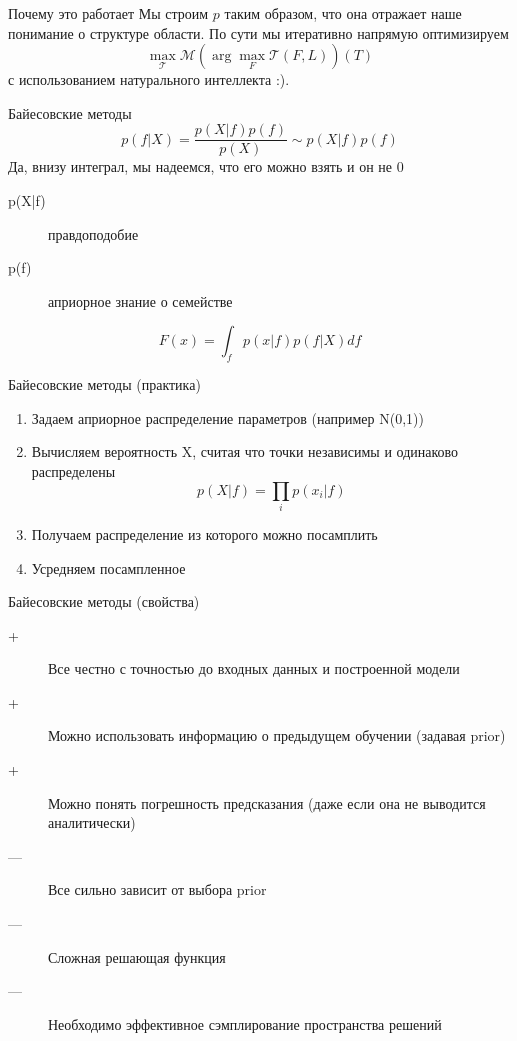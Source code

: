 \documentclass[14pt, fleqn, xcolor={dvipsnames, table}]{beamer}
\begin{document}
\begin{frame}{Почему это работает}
Мы строим $p$ таким образом, что она отражает наше понимание о структуре области. По сути мы итеративно напрямую оптимизируем
$$
\max_{\mathcal{T}} \mathcal{M} \left(\arg\max_{F} \mathcal{T}(F, L)\right)(T)
$$
с использованием натурального интеллекта :).
\end{frame}
\begin{frame}{Байесовские методы}
$$
p(f | X) = \frac{p(X|f) p(f)}{p(X)} \sim p(X|f) p(f)
$$
Да, внизу интеграл, мы надеемся, что его можно взять и он не 0
\begin{description}
  \item[p(X|f)] правдоподобие
  \item[p(f)] априорное знание о семействе
\end{description}
$$
F(x) = \int_f p(x|f) p(f|X) df
$$
\end{frame}

\begin{frame}{Байесовские методы (практика)}
\begin{enumerate}
  \item Задаем априорное распределение параметров (например N(0,1))
  \item Вычисляем вероятность X, считая что точки независимы и одинаково распределены
  $$
  p(X|f) = \prod_i p(x_i|f)
  $$
  \item Получаем распределение из которого можно посамплить
  \item Усредняем посампленное
\end{enumerate}
\end{frame}

\begin{frame}{Байесовские методы (свойства)}
\begin{description}
  \item[\color{green}+] Все честно с точностью до входных данных и построенной модели
  \item[\color{green}+] Можно использовать информацию о предыдущем обучении (задавая prior)
  \item[\color{green}+] Можно понять погрешность предсказания (даже если она не выводится аналитически)
\end{description}
\begin{description}
  \item[\color{red}---] Все сильно зависит от выбора prior
  \item[\color{red}---] Сложная решающая функция
  \item[\color{red}---] Необходимо эффективное сэмплирование пространства решений
\end{description}
\end{frame}
\end{document}
